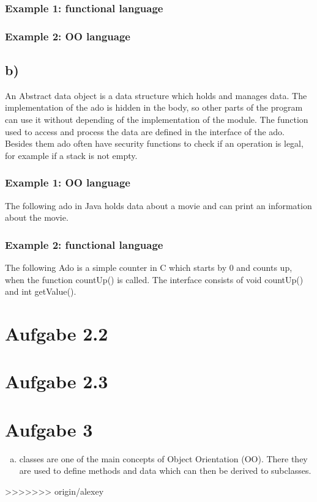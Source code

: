 \documentclass[a4paper,10pt]{scrartcl}[2003/01/01]
\begin{document}
	\subsubsection*{Example 1: functional language}
	
	
	\subsubsection*{Example 2: OO language}
	
	
	
	\subsection*{b)}
	An Abstract data object is a data structure which holds and manages data. The implementation of the ado is hidden in the body, so other parts of the program can use it without depending of the implementation of the module. The function used to access and process the data are defined in the interface of the ado. Besides them ado often have security functions to check if an operation is legal, for example if a stack is not empty. 
	
	\subsubsection*{Example 1: OO language}
	The following ado in Java holds data about a movie and can print an information about the movie. 
	
	
	\subsubsection*{Example 2: functional language}
	The following Ado is a simple counter in C which starts by 0 and counts up, when the function countUp() is called. The interface consists of void countUp() and int getValue().
	
	
	
	\section*{Aufgabe 2.2}
	
	\section*{Aufgabe 2.3}
	
	\section{Aufgabe 3}
	\begin{enumerate}[a)]
		\item classes are one of the main concepts of Object Orientation (OO). There they are used to define methods and data which can then be derived to subclasses.
		
	\end{enumerate}
	
>>>>>>> origin/alexey
\end{document}
